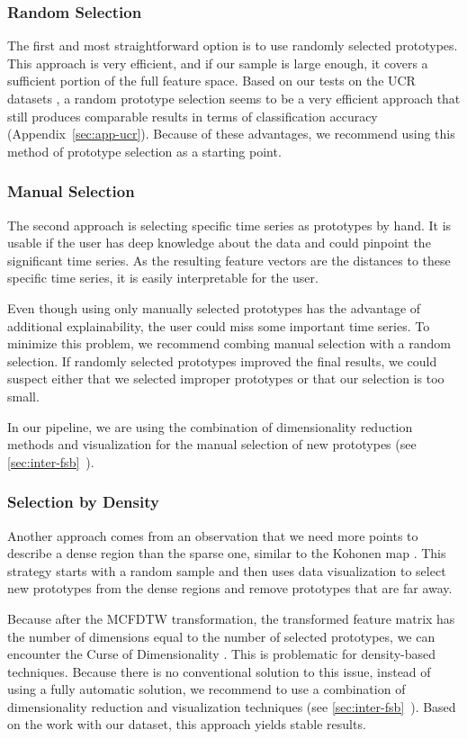 \subsubsection{Random Selection}
The first and most straightforward option is to use randomly selected prototypes. This approach is very efficient, and if our sample is large enough, it covers a sufficient portion of the full feature space. Based on our tests on the UCR datasets \cite{exp:UCRArchive2018}, a random prototype selection seems to be a very efficient approach that still produces comparable results in terms of classification accuracy (Appendix~\ref{sec:app-ucr}). Because of these advantages, we recommend using this method of prototype selection as a starting point.

\subsubsection{Manual Selection}
The second approach is selecting specific time series as prototypes by hand. It is usable if the user has deep knowledge about the data and could pinpoint the significant time series. As the resulting feature vectors are the distances to these specific time series, it is easily interpretable for the user.

Even though using only manually selected prototypes has the advantage of additional explainability, the user could miss some important time series. To minimize this problem, we recommend combing manual selection with a random selection. If randomly selected prototypes improved the final results, we could suspect either that we selected improper prototypes or that our selection is too small.

In our pipeline, we are using the combination of dimensionality reduction methods and visualization for the manual selection of new prototypes (see \ref{sec:inter-fsb}~).

\subsubsection{Selection by Density}
Another approach comes from an observation that we need more points to describe a dense region than the sparse one, similar to the Kohonen map \cite{exp:Kohonen1982}. This strategy starts with a random sample and then uses data visualization to select new prototypes from the dense regions and remove prototypes that are far away.

Because after the MCFDTW transformation, the transformed feature matrix has the number of dimensions equal to the number of selected prototypes, we can encounter the Curse of Dimensionality \cite{exp:curse-of-dim}. This is problematic for density-based techniques. Because there is no conventional solution to this issue, instead of using a fully automatic solution, we recommend to use a combination of dimensionality reduction and visualization techniques (see \ref{sec:inter-fsb}~). Based on the work with our dataset, this approach yields stable results.

